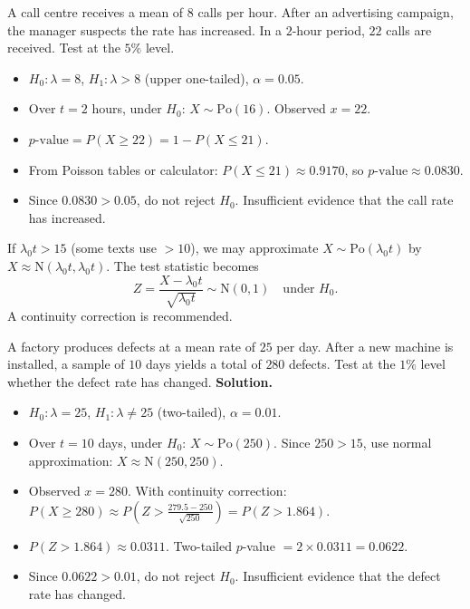 \documentclass[11pt]{article}
\begin{document}
\begin{exemplebox}
A call centre receives a mean of $8$ calls per hour. After an advertising campaign, the manager suspects the rate has increased. In a $2$-hour period, $22$ calls are received. Test at the $5\%$ level.
\begin{itemize}
\item $H_0 : \lambda = 8$, $H_1 : \lambda > 8$ (upper one-tailed), $\alpha = 0.05$.
\item Over $t = 2$ hours, under $H_0$: $X \sim \mathrm{Po}(16)$. Observed $x = 22$.
\item $p\text{-value} = P(X \geq 22) = 1 - P(X \leq 21)$.
\item From Poisson tables or calculator: $P(X \leq 21) \approx 0.9170$, so $p\text{-value} \approx 0.0830$.
\item Since $0.0830 > 0.05$, do not reject $H_0$. Insufficient evidence that the call rate has increased.
\end{itemize}
\end{exemplebox}

\begin{propriete}
If $\lambda_0 t > 15$ (some texts use $> 10$), we may approximate $X \sim \mathrm{Po}(\lambda_0 t)$ by $X \approx \mathrm{N}(\lambda_0 t, \lambda_0 t)$. The test statistic becomes
\[ Z = \frac{X - \lambda_0 t}{\sqrt{\lambda_0 t}} \sim \mathrm{N}(0,1) \quad\text{under } H_0. \]
A continuity correction is recommended.
\end{propriete}

\begin{exoresolu}
A factory produces defects at a mean rate of $25$ per day. After a new machine is installed, a sample of $10$ days yields a total of $280$ defects. Test at the $1\%$ level whether the defect rate has changed.
\tcblower
\textbf{Solution.}
\begin{itemize}
\item $H_0 : \lambda = 25$, $H_1 : \lambda \neq 25$ (two-tailed), $\alpha = 0.01$.
\item Over $t = 10$ days, under $H_0$: $X \sim \mathrm{Po}(250)$. Since $250 > 15$, use normal approximation: $X \approx \mathrm{N}(250, 250)$.
\item Observed $x = 280$. With continuity correction: $P(X \geq 280) \approx P\left(Z > \frac{279.5 - 250}{\sqrt{250}}\right) = P(Z > 1.864)$.
\item $P(Z > 1.864) \approx 0.0311$. Two-tailed $p$-value $= 2 \times 0.0311 = 0.0622$.
\item Since $0.0622 > 0.01$, do not reject $H_0$. Insufficient evidence that the defect rate has changed.
\end{itemize}
\end{exoresolu}
\end{document}
